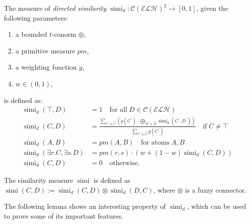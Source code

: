\documentclass[]{llncs}
\DeclareMathOperator{\simi}{simi}
\begin{document}
  \begin{definition}[\(\simi_d\)]\label{simi-d}
    The measure of \emph{directed similarity} \(\simi_d \colon {\mathcal{C}(\mathcal{ELH})}^2 \to [0,1]\), given the following parameters:
    \begin{enumerate}
      \item a bounded \(t\)-conorm \(\oplus\),
      \item a primitive measure \(pm\),
      \item a weighting function \(g\),
      \item \(w \in (0,1)\),
    \end{enumerate}
    is defined as:
    \begin{align}
      \simi_d(\top,D) &= 1 \quad
      \text{for all}\; D \in \mathcal{C}(\mathcal{ELH}) \\
      \simi_d(C,D) &=
      \frac{\sum_{C^\prime \in \widehat{C}}\left(g(C^\prime) \cdot \bigoplus_{D^\prime \in \widehat{D}} \simi_d(C^\prime, D^\prime)\right)}%
      {\sum_{C^\prime \in \widehat{C}}g(C^\prime)} \quad \text{if}\; C \ne \top \label{simi:general}\\
      \simi_d(A,B) &= pm(A,B) \quad \text{for atoms}\; A,B \\
      \simi_d(\exists{}r.C,\exists{}s.D) &=
      pm(r,s) \cdot \left(w + (1-w)\simi_d(C,D)\right) \\
      \simi_d(C,D) &= 0 \quad \text{otherwise}.
    \end{align}
  \end{definition}

  \begin{definition}[\(\simi\)]
    The similarity measure \(\simi\) is defined as \(\simi(C,D) := \simi_d(C,D) \otimes \simi_d(D,C)\), where \(\otimes{}\) is a fuzzy connector.
  \end{definition}

  The following lemma shows an interesting property of \(\simi_d\), which can be used to prove some of its important features.
\end{document}

